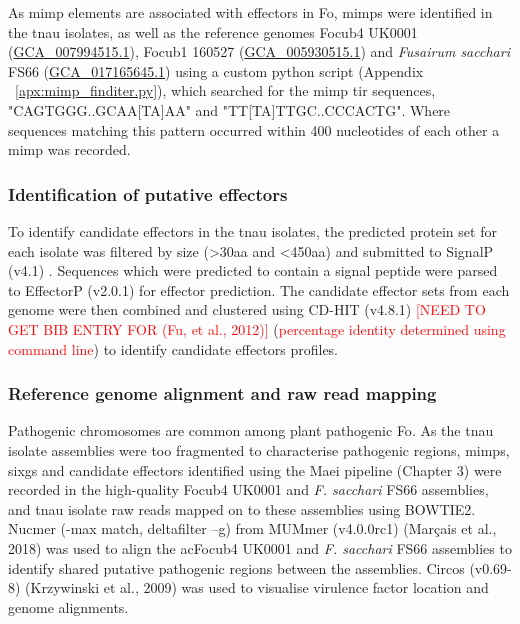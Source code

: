 As \acf{mimp} elements are associated with effectors in \ac{Fo}, \acp{mimp} were identified in the \ac{tnau} isolates, as well as the reference genomes \ac{Focub4} UK0001 (\href{https://www.ncbi.nlm.nih.gov/datasets/genome/GCA_007994515.1/}{GCA\_007994515.1}), \ac{Focub1} 160527 (\href{https://www.ncbi.nlm.nih.gov/datasets/genome/GCA_005930515.1/}{GCA\_005930515.1}) and \textit{Fusairum sacchari} FS66 (\href{https://www.ncbi.nlm.nih.gov/datasets/genome/GCA_017165645.1/}{GCA\_017165645.1}) using a custom python script (Appendix ~\ref{apx:mimp_finditer.py}), which searched for the \ac{mimp} \ac{tir} sequences, "CAGTGGG..GCAA[TA]AA" and "TT[TA]TTGC..CCCACTG". Where sequences matching this pattern occurred within 400 nucleotides of each other a \ac{mimp} was recorded. 

\subsubsection{Identification of putative effectors}

To identify candidate effectors in the \ac{tnau} isolates, the predicted protein set for each isolate was filtered by size (>30aa and <450aa) and submitted to SignalP (v4.1) \parencite{Petersen2011}. Sequences which were predicted to contain a signal peptide were parsed to EffectorP (v2.0.1) \parencite{Sperschneider2018} for effector prediction. The candidate effector sets from each genome were then combined and clustered using CD-HIT (v4.8.1) \textcolor{red}{[NEED TO GET BIB ENTRY FOR (Fu, et al., 2012)]} (\textcolor{red}{percentage identity determined using command line}) to identify candidate effectors profiles. 

\subsubsection{Reference genome alignment and raw read mapping}

Pathogenic chromosomes are common among plant pathogenic \ac{Fo}. As the \ac{tnau} isolate assemblies were too fragmented to characterise  pathogenic regions, \acp{mimp}, \acp{sixg} and candidate effectors identified using the Maei pipeline (Chapter 3) were recorded in the high-quality \ac{Focub4} UK0001 and \textit{F. sacchari} FS66 assemblies, and \ac{tnau} isolate raw reads mapped on to these assemblies using BOWTIE2. Nucmer (-max match, deltafilter –g) from MUMmer (v4.0.0rc1) (Marçais et al., 2018) was used to align the ac{Focub4} UK0001 and \textit{F. sacchari} FS66 assemblies to identify shared putative pathogenic regions between the assemblies. Circos (v0.69-8) (Krzywinski et al., 2009) was used to visualise virulence factor location and genome alignments. 

